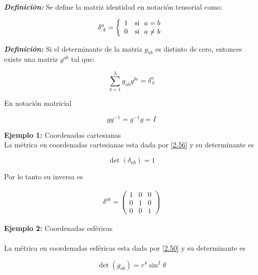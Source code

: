 \documentclass[12pt]{report}
\begin{document}
\textbf{\textit{Definición:}} Se define la matriz identidad en notación tensorial como:

\begin{eqnarray} \label{2.69}
 \delta^a_{\ b} =
\left\{ \begin{array}{ccc} 
 1 & {\rm  si~~} a=b   \\ 
 0 & {\rm  si~~} a\ne b  \\  
\end{array} \right.
\end{eqnarray}


\textbf{\textit{Definición:}} Si el determinante de la matriz $g_{ab}$ es distinto de cero, entonces existe una matriz $g^{ab}$ tal que:

\begin{equation} \label{2.70}
\displaystyle \sum_{b=1}^3 g_{ab}g^{bc}=\delta^a_{\ b}
\end{equation}

En notación matricial 

\begin{equation}\label{2.71}
gg^{-1}=g^{-1}g=I
\end{equation}

\textbf{Ejemplo 1:} Coordenadas cartesianas 
\\

La métrica en coordenadas cartesianas esta dada por \eqref{2.56} y su determinante es 

\begin{equation}\label{2.72}
\det(\delta_{ab})=1
\end{equation}

Por lo tanto su inversa es

\begin{eqnarray} \label{2.73}
\delta^{ab}=
\left(
\begin{array}{ccc}
1 & 0 & 0 \\
0 & 1 & 0 \\
0 & 0 & 1
\end{array}
\right)
\end{eqnarray}

\textbf{Ejemplo 2:} Coordenadas esféricas \\
\\
La métrica en coordenadas esféricas esta dada por \eqref{2.50} y su determinante es

\begin{equation}\label{2.74}
\det(g_{ab})=r^4 \sin^2\theta
\end{equation}
\end{document}
